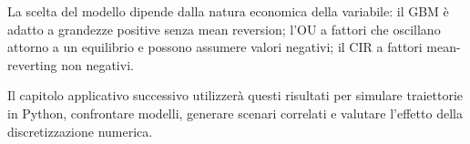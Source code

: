 La scelta del modello dipende dalla natura economica della variabile:
il GBM \`{e} adatto a grandezze positive senza mean reversion; l'OU a
fattori che oscillano attorno a un equilibrio e possono assumere
valori negativi; il CIR a fattori mean-reverting non negativi.

Il capitolo applicativo successivo utilizzer\`{a} questi risultati per
simulare traiettorie in Python, confrontare modelli, generare scenari
correlati e valutare l'effetto della discretizzazione numerica.












